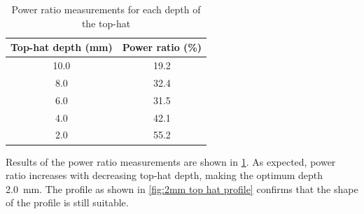 \documentclass[a4paper,11pt]{article}
\begin{document}
\begin{table}[h!]
\centering
\begin{tabular}{|c|c|}
\hline
Top-hat depth (mm) & Power ratio (\%) \\
\hline
10.0 & 19.2  \\
8.0 & 32.4 \\
6.0 & 31.5\\
4.0 & 42.1 \\
2.0 & 55.2 \\
\hline
\end{tabular}
\caption{Power ratio measurements for each depth of the top-hat}
\label{tab:top hat efficiencies}
\end{table}

Results of the power ratio measurements are shown in \cref{tab:top hat efficiencies}. As expected, power ratio increases with decreasing top-hat depth, making the optimum depth 2.0~mm. The profile as shown in \cref{fig:2mm top hat profile} confirms that the shape of the profile is still suitable.
\end{document}
